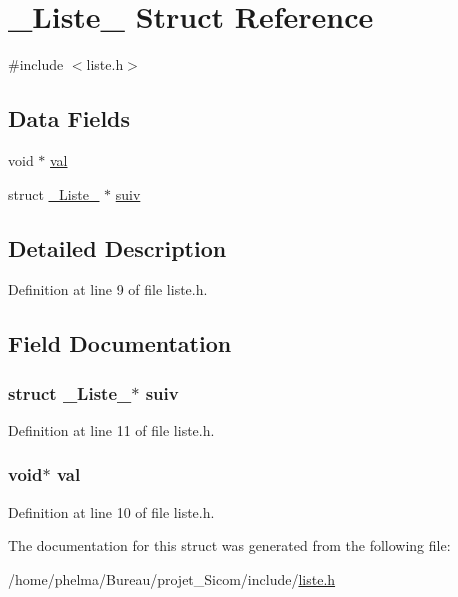 \hypertarget{struct___liste__}{\section{\-\_\-\-Liste\-\_\- Struct Reference}
\label{struct___liste__}
}


{\ttfamily \#include $<$liste.\-h$>$}

\subsection*{Data Fields}
\begin{DoxyCompactItemize}
\item 
void $\ast$ \hyperlink{struct___liste___ab03f36f103bdec81305fd301f1f93885}{val}
\item 
struct \hyperlink{struct___liste__}{\-\_\-\-Liste\-\_\-} $\ast$ \hyperlink{struct___liste___a7b04951b6e3b6b7a5f1bff3f54f57218}{suiv}
\end{DoxyCompactItemize}


\subsection{Detailed Description}


Definition at line 9 of file liste.\-h.



\subsection{Field Documentation}
\hypertarget{struct___liste___a7b04951b6e3b6b7a5f1bff3f54f57218}{
\subsubsection[{suiv}]{\setlength{\rightskip}{0pt plus 5cm}struct {\bf \-\_\-\-Liste\-\_\-}$\ast$ suiv}}\label{struct___liste___a7b04951b6e3b6b7a5f1bff3f54f57218}


Definition at line 11 of file liste.\-h.

\hypertarget{struct___liste___ab03f36f103bdec81305fd301f1f93885}{
\subsubsection[{val}]{\setlength{\rightskip}{0pt plus 5cm}void$\ast$ val}}\label{struct___liste___ab03f36f103bdec81305fd301f1f93885}


Definition at line 10 of file liste.\-h.



The documentation for this struct was generated from the following file\-:\begin{DoxyCompactItemize}
\item 
/home/phelma/\-Bureau/projet\-\_\-\-Sicom/include/\hyperlink{liste_8h}{liste.\-h}\end{DoxyCompactItemize}
